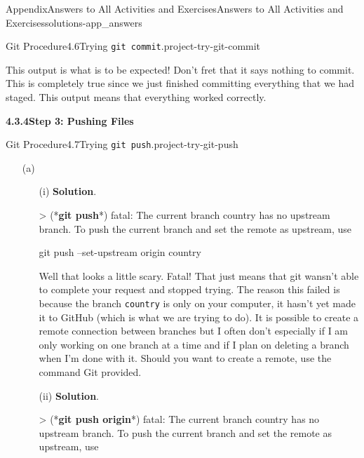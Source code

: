 \documentclass[oneside,10pt,]{book}
\newcommand{\blocktitlefont}{\relax}
\newcommand{\mono}[1]{\texttt{#1}}
\newcommand{\consoleinput}[1]{\textbf{#1}}
\begin{document}
\begin{solutions-chapter}{Appendix}{Answers to All Activities and Exercises}{}{Answers to All Activities and Exercises}{}{}{solutions-app_answers}
\begin{projectsolution}{Git Procedure}{4.6}{Trying \mono{git commit}.}{project-try-git-commit}
\begin{enumerate}[font=\bfseries,label=(\alph*),ref=\alph*]
This output is what is to be expected! Don't fret that it says nothing to commit. This is completely true since we just finished committing everything that we had staged. This output means that everything worked correctly.%
\end{enumerate}%
\end{projectsolution}%
\par\medskip
\noindent\textbf{\Large{}4.3.4\space\textperiodcentered\space{}Step 3: Pushing Files}
\begin{projectsolution}{Git Procedure}{4.7}{Trying \mono{git push}.}{project-try-git-push}%
\begin{enumerate}[font=\bfseries,label=(\alph*),ref=\alph*]%
\item[(a)]\begin{enumerate}[font=\bfseries,label=(\roman*),ref=\theenumi.\roman*]%
\item[(i)]\noindent\textbf{\blocktitlefont Solution}.\hypertarget{solution-try-git-push-c-b-b-back}{}\quad{}\begin{console}{0}{1}{0}
> (*\consoleinput{git push}*)
fatal: The current branch country has no upstream branch.
To push the current branch and set the remote as upstream, use

    git push --set-upstream origin country
\end{console}
Well that looks a little scary. Fatal! That just means that git wansn't able to complete your request and stopped trying. The reason this failed is because the branch \mono{country} is only on your computer, it hasn't yet made it to GitHub (which is what we are trying to do). It is possible to create a remote connection between branches but I often don't especially if I am only working on one branch at a time and if I plan on deleting a branch when I'm done with it. Should you want to create a remote, use the command Git provided.%
\item[(ii)]\noindent\textbf{\blocktitlefont Solution}.\hypertarget{solution-try-git-push-c-c-b-back}{}\quad{}\begin{console}{0}{1}{0}
> (*\consoleinput{git push origin}*)
fatal: The current branch country has no upstream branch.
To push the current branch and set the remote as upstream, use


\end{console}
\end{enumerate}
\end{enumerate}
\end{projectsolution}
\end{solutions-chapter}
\end{document}
